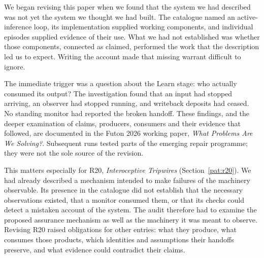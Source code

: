 \xobservationheading\label{sec:observation}

We began revising this paper when we found that the system we had described
was not yet the system we thought we had built. The catalogue named an
active-inference loop, its implementation supplied working components, and
individual episodes supplied evidence of their use. What we had not established
was whether those components, connected as claimed, performed the work that
the description led us to expect. Writing the account made that missing
warrant difficult to ignore.

The immediate trigger was a question about the Learn stage: who actually
consumed its output? The investigation found that an input had stopped arriving,
an observer had stopped running, and writeback deposits had ceased. No standing
monitor had reported the broken handoff. These findings, and the deeper
examination of claims, producers, consumers and their evidence that followed,
are documented in the Futon 2026 working paper, \emph{What Problems Are We
Solving?}. Subsequent runs tested parts of the emerging repair programme;
they were not the sole source of the revision.

This matters especially for R20, \emph{Interoceptive Tripwires}
(Section~\ref{pat:r20}). We had already described a mechanism intended to make
failures of the machinery observable. Its presence in the catalogue did not
establish that the necessary observations existed, that a monitor consumed
them, or that its checks could detect a mistaken account of the system. The
audit therefore had to examine the proposed assurance mechanism as well as
the machinery it was meant to observe. Revising R20 raised obligations for
other entries: what they produce, what consumes those products, which identities
and assumptions their handoffs preserve, and what evidence could contradict
their claims.

